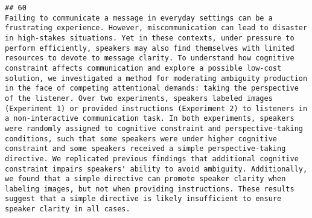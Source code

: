 \documentclass[
  english,
  man]{apa6}
\begin{document}
\begin{verbatim}
## 60                                                                                                                                                                                                                                                                                                                                                                                                                                                                                                                                                                                                                                                                                                                                                                                                                                                                                                                                                                                                                                                                                                                                                                                                                                                                                                         Failing to communicate a message in everyday settings can be a frustrating experience. However, miscommunication can lead to disaster in high-stakes situations. Yet in these contexts, under pressure to perform efficiently, speakers may also find themselves with limited resources to devote to message clarity. To understand how cognitive constraint affects communication and explore a possible low-cost solution, we investigated a method for moderating ambiguity production in the face of competing attentional demands: taking the perspective of the listener. Over two experiments, speakers labeled images (Experiment 1) or provided instructions (Experiment 2) to listeners in a non-interactive communication task. In both experiments, speakers were randomly assigned to cognitive constraint and perspective-taking conditions, such that some speakers were under higher cognitive constraint and some speakers received a simple perspective-taking directive. We replicated previous findings that additional cognitive constraint impairs speakers' ability to avoid ambiguity. Additionally, we found that a simple directive can promote speaker clarity when labeling images, but not when providing instructions. These results suggest that a simple directive is likely insufficient to ensure speaker clarity in all cases.

\end{verbatim}
\end{document}
